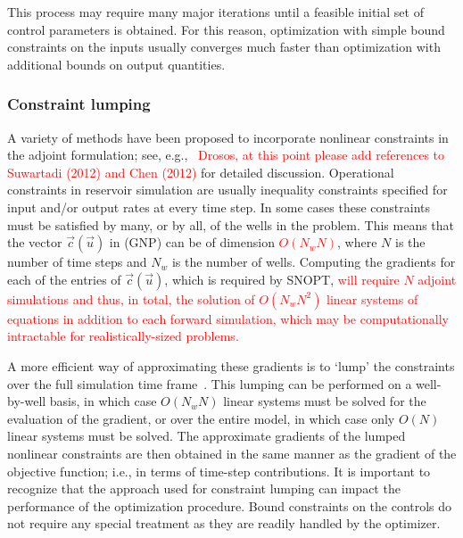 \documentclass[twocolumn,numbook]{svjour3}          %
\newcommand{\red}[1]{\textcolor{red}{#1}}
\def\u{{\vec u}}
\def\c{{\vec c}}
\begin{document}
This process may require many major iterations until a feasible initial set of control parameters
is obtained. For this reason, optimization with simple bound constraints on 
the inputs usually converges much faster than optimization with additional bounds
on output quantities.

\subsubsection{Constraint lumping}

A variety of methods have been proposed to
incorporate nonlinear constraints in the adjoint formulation; see,
e.g.,~\cite{Pallav:2006,Jansen:2011} \red{Drosos, at this point please add references to Suwartadi (2012) and Chen (2012)} for detailed discussion. 
Operational constraints in reservoir simulation are usually inequality constraints specified for input and/or output rates at every time step. In some cases these constraints must be satisfied by many, or by all, of the wells in the problem.
This means that the vector $\c(\u)$ in (GNP) can be of dimension \red{$O(N_w N)$}, where $N$ is the number of time steps and $N_w$ is the number of wells. Computing the gradients
for each of the entries of $\c(\u)$, which is required by SNOPT, \red{will require $N$ adjoint simulations and thus, in total, the solution of $O(N_w N^2 )$ linear systems of equations in addition to each forward simulation, which may be
computationally intractable for realistically-sized problems.}

A more efficient way of approximating these gradients 
is to `lump' the constraints over the full simulation time frame~\cite{Pallav:2008}. 
This lumping can be performed on a well-by-well basis, in which case $O(N_w N)$ linear systems 
must be solved for the evaluation of the gradient, or over the entire model, in which case only $O(N)$ linear systems must be solved. The approximate gradients of the lumped
nonlinear constraints are then obtained in the same manner as the gradient of the
objective function; i.e., in terms of time-step contributions. It is important to recognize that the approach used for constraint lumping can impact the performance of the optimization procedure. Bound constraints on the controls do not require any special treatment as they are readily handled by the optimizer.
\end{document}

